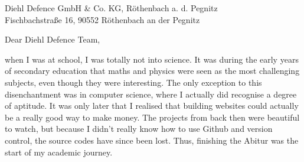 \documentclass[11pt]{letter}
\begin{document}
\begin{letter}{%
Diehl Defence GmbH & Co. KG, Röthenbach a. d. Pegnitz\\%
Fischbachstraße 16, 90552 Röthenbach an der Pegnitz\\%
}

\opening{Dear Diehl Defence Team,}

when I was at school, I was totally not into science. It was during the early years of secondary education that maths and physics were seen as the most challenging subjects, even though they were interesting. The only exception to this disenchantment was in computer science, where I actually did recognise a degree of aptitude. It was only later that I realised that building websites could actually be a really good way to make money. The projects from back then were beautiful to watch, but because I didn't really know how to use Github and version control, the source codes have since been lost. Thus, finishing the Abitur was the start of my academic journey.


\end{letter}
\end{document}
